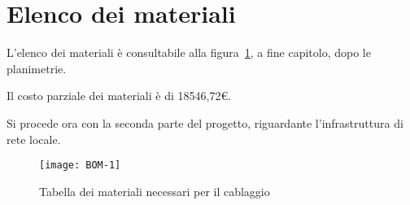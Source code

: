 %

\newpage
\section{Elenco dei materiali}

L'elenco dei materiali è consultabile alla figura~\ref{fig:elenco-materiali}, a fine capitolo, dopo le planimetrie.

Il costo parziale dei materiali è di 18546,72€.

Si procede ora con la seconda parte del progetto, riguardante l'infrastruttura di rete locale.

\begin{figure}[ht]
  \texttt{[image: BOM-1]}
  \caption{Tabella dei materiali necessari per il cablaggio}\label{fig:elenco-materiali}
\end{figure}